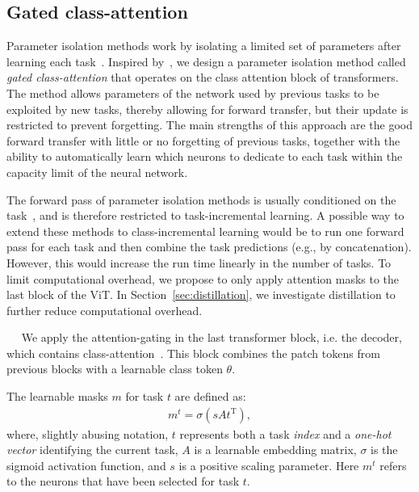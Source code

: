 \documentclass[twocolumn]{svjour3}          %
\newcommand{\minisection}[1]{\vspace{0.04in} \noindent {\bf #1}\ \ }
\begin{document}
\subsection{Gated class-attention}
\label{sec:gated-class-attention}

Parameter isolation methods work by isolating a limited set of parameters after learning each task~\citep{delange2021continual, mallya2018packnet, rusu2016progressive,serra2018overcoming}.
Inspired by~\cite{serra2018overcoming}, we design a parameter isolation method called \emph{gated class-attention} that operates on the class attention block of transformers.  
The method allows parameters of the network used by previous tasks to be exploited by new tasks, thereby allowing for forward transfer, but their update is restricted to prevent forgetting. The main strengths of this approach are the good forward transfer with little or no forgetting of previous tasks, together with the ability to automatically learn which neurons to dedicate to each task within the capacity limit of the neural network.

The forward pass of parameter isolation methods is usually conditioned on the task~\citep{mallya2018packnet,masana2021ternary,serra2018overcoming}, and is therefore restricted to task-incremental learning. A possible way to extend these methods to class-incremental learning would be to run one forward pass for each task and then combine the task predictions (e.g., by concatenation). However, this would increase the run time linearly in the number of tasks. To limit computational overhead, we propose to only apply attention masks to the last block of the ViT. In Section~\ref{sec:distillation}, we investigate distillation to further reduce computational overhead.

\minisection{Mask-based class-attention gating.} We apply the attention-gating in the last transformer block, i.e. the decoder, which contains class-attention~\citep{touvron2021going}. This block combines the patch tokens from previous blocks with a learnable class token $\theta$. 

The learnable masks $m$ for task $t$ are defined as:
\begin{eqnarray}
\label{eq:mask}
m^t=\sigma(sAt^{\textrm{T}}),
\end{eqnarray}
where, slightly abusing notation, $t$ represents both a task \emph{index} and a \emph{one-hot vector} identifying the current task, $A$ is a learnable embedding matrix, $\sigma$ is the sigmoid activation function, and $s$ is a positive scaling parameter. 
Here $m^t$ refers to the neurons that have been selected for task $t$.
\end{document}
